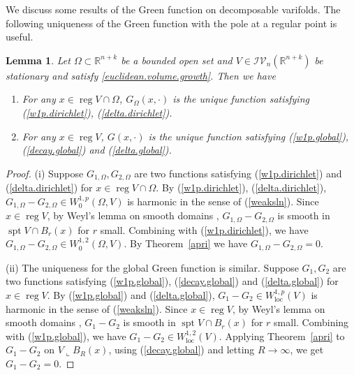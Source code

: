 \documentclass[11pt]{amsart}
\newtheorem{lemma}[theorem]{Lemma}
\theoremstyle{definition}
\newcommand{\R}{\mathbb{R}}
\newcommand{\IV}{\mathcal{IV}}
\newcommand{\loc}{\mathrm{loc}}
\DeclareMathOperator{\spt}{spt}
\DeclareMathOperator{\reg}{reg}
\begin{document}
We discuss some results of the Green function on decomposable varifolds. The following uniqueness of the Green function with the pole at a regular point is useful.
\begin{lemma}\label{uniqueness.Green.regular.points}
	Let $\Omega\subset\R^{n+k}$ be a bounded open set and $V\in \IV_n(\R^{n+k})$ be stationary and satisfy \eqref{euclidean.volume.growth}.
	Then we have
	\begin{enumerate}
		\item [(i)]
		For any $x\in \reg V\cap \Omega$, $G_\Omega(x,\cdot)$ is the unique function satisfying (\ref{w1p.dirichlet}), (\ref{delta.dirichlet}). 
		\item[(ii)]
		For any $x\in \reg V$, $G(x,\cdot)$ is the unique function satisfying (\ref{w1p.global}), (\ref{decay.global}) and (\ref{delta.global}).
	\end{enumerate}
\end{lemma}
\begin{proof}
	(i) Suppose $G_{1,\Omega},G_{2,\Omega}$ are two functions satisfying (\ref{w1p.dirichlet}) and (\ref{delta.dirichlet}) for $x\in \reg V\cap \Omega$. By (\ref{w1p.dirichlet}), (\ref{delta.dirichlet}), $G_{1,\Omega}-G_{2,\Omega}\in W^{1,p}_0(\Omega,V)$ is harmonic in the sense of (\ref{weaksln}). Since $x\in \reg V$, by Weyl's lemma on smooth domains \cite{burch1978dini}, $G_{1,\Omega}-G_{2,\Omega}$ is smooth in $\spt V\cap B_r(x)$ for $r$ small. Combining with (\ref{w1p.dirichlet}), we have $G_{1,\Omega}-G_{2,\Omega}\in W^{1,2}_0(\Omega,V)$. By Theorem~\ref{apri} we have $G_{1,\Omega}-G_{2,\Omega}=0$.
	
	(ii) The uniqueness for the global Green function is similar. Suppose $G_1,G_2$ are two functions satisfying (\ref{w1p.global}), (\ref{decay.global}) and (\ref{delta.global}) for $x\in \reg V$. By (\ref{w1p.global}) and (\ref{delta.global}), $G_1-G_2\in W^{1,p}_\loc(V)$ is harmonic in the sense of (\ref{weaksln}). Since $x\in \reg V$, by Weyl's lemma on smooth domains \cite{burch1978dini}, $G_1-G_2$ is smooth in $\spt V\cap B_r(x)$ for $r$ small. Combining with (\ref{w1p.global}), we have $G_1-G_2\in W^{1,2}_\loc(V)$. Applying Theorem~\ref{apri} to $G_1-G_2$ on $V\llcorner B_R(x)$, using (\ref{decay.global}) and letting $R\to \infty$, we get $G_1-G_2=0$.
\end{proof}
\end{document}
